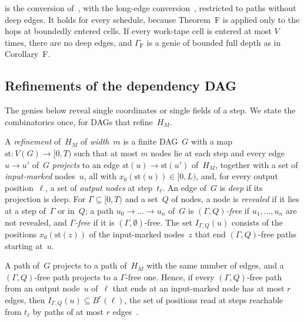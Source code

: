  is the conversion of~\cite[Lemma~2.6]{BoundedNesting2026}, with the long-edge
conversion~\cite[Lemma~4.21]{FourthPaper2026}, restricted to paths without deep edges. It holds for every schedule,
because Theorem~F is applied only to the hops at boundedly entered cells. If every work-tape cell is entered at most $V$
times, there are no deep edges, and $\Gamma_{\mathrm F}$ is a genie of bounded full depth as in Corollary~F.

\subsection{Refinements of the dependency DAG}\label{sec:hop-refine}

The genies below reveal single coordinates or single fields of a step. We state the combinatorics once, for DAGs that
refine~$H_M$.

\begin{definition}[Refinements]\label{def:refinement}
A \emph{refinement} of~$H_M$ of \emph{width}~$m$ is a finite DAG~$G$ with a map $\mathrm{st}\colon V(G)\to[0,T)$ such
that at most $m$ nodes lie at each step and every edge $u\to u'$ of~$G$ \emph{projects} to an edge
$\mathrm{st}(u)\to\mathrm{st}(u')$ of~$H_M$, together with a set of \emph{input-marked} nodes~$u$, all with
$x_0(\mathrm{st}(u))\in[0,L)$, and, for every output position~$\ell$, a set of \emph{output nodes} at step~$t_\ell$. An
edge of~$G$ is \emph{deep} if its projection is deep. For $\Gamma\subseteq[0,T)$ and a set~$Q$ of nodes, a node is
\emph{revealed} if it lies at a step of~$\Gamma$ or in~$Q$; a path $u_0\to\dots\to u_n$ of~$G$ is
\emph{$(\Gamma,Q)$-free} if $u_1,\dots,u_n$ are not revealed, and \emph{$\Gamma$-free} if it is
$(\Gamma,\emptyset)$-free. The set $I_{\Gamma,Q}(u)$ consists of the positions $x_0(\mathrm{st}(z))$ of the input-marked
nodes~$z$ that end $(\Gamma,Q)$-free paths starting at~$u$.
\end{definition}

A path of~$G$ projects to a path of~$H_M$ with the same number of edges, and a $(\Gamma,Q)$-free path projects to a
$\Gamma$-free one. Hence, if every $(\Gamma,Q)$-free path from an output node~$u$ of~$\ell$ that ends at an input-marked
node has at most $r$ edges, then $I_{\Gamma,Q}(u)\subseteq B^r(\ell)$, the set of positions read at steps reachable from
$t_\ell$ by paths of at most $r$ edges~\cite[Definition~7.2]{BoundedNesting2026}.

